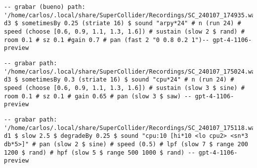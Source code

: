 \begin{minipage}[t]{1\textwidth}
    \centering
    \begin{lstlisting}[style=SuperCollider-IDE, basicstyle=\footnotesize\ttfamily, numbers=none]
-- grabar (bueno) path: '/home/carlos/.local/share/SuperCollider/Recordings/SC_240107_174935.wav'
d3 $ sometimesBy 0.25 (striate 16) $ sound "arpy*24" # n (run 24) # speed (choose [0.6, 0.9, 1.1, 1.3, 1.6]) # sustain (slow 2 $ rand) # room 0.1 # sz 0.1 #gain 0.7 # pan (fast 2 "0 0.8 0.2 1")-- gpt-4-1106-preview                                
    \end{lstlisting}
    \vspace{1cm}
\end{minipage}










\begin{minipage}[t]{1\textwidth}
    \centering
    \begin{lstlisting}[style=SuperCollider-IDE, basicstyle=\footnotesize\ttfamily, numbers=none]
-- grabar path: '/home/carlos/.local/share/SuperCollider/Recordings/SC_240107_175024.wav'
d3 $ sometimesBy 0.3 (striate 16) $ sound "cpu*24" # n (run 24) # speed (choose [0.6, 0.9, 1.1, 1.3, 1.6]) # sustain (slow 3 $ sine) # room 0.1 # sz 0.1 # gain 0.65 # pan (slow 3 $ saw) -- gpt-4-1106-preview                          
    \end{lstlisting}
    \vspace{1cm}
\end{minipage}











\begin{minipage}[t]{1\textwidth}
    \centering
    \begin{lstlisting}[style=SuperCollider-IDE, basicstyle=\footnotesize\ttfamily, numbers=none]
-- grabar path: '/home/carlos/.local/share/SuperCollider/Recordings/SC_240107_175118.wav'
d1 $ slow 2.5 $ degradeBy 0.25 $ sound "cpu:10 [hi*10 <lo cpu2> <sn*3 db*5>]" # pan (slow 2 $ sine) # speed (0.5) # lpf (slow 7 $ range 200 1200 $ rand) # hpf (slow 5 $ range 500 1000 $ rand) -- gpt-4-1106-preview                              
    \end{lstlisting}
    \vspace{1cm}
\end{minipage}






